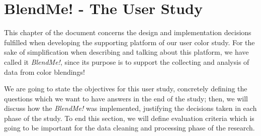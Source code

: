 
\chapter{BlendMe! - The User Study}
\label{chapter:design}
%
This chapter of the document concerns the design and implementation decisions fulfilled when developing the
supporting platform of our user color study. For the sake of simplification when describing and talking about
this platform, we have called it \emph{BlendMe!}, since its purpose is to support the collecting and analysis
of data from color blendings! \par
%
We are going to state the objectives for this user study, concretely defining the questions which we want to
have answers in the end of the study; then, we will discuss how the \emph{BlendMe!} was implemented, justifying
the decisions taken in each phase of the study. To end this section, we will define evaluation criteria which
is going to be important for the data cleaning and processing phase of the research.
%
